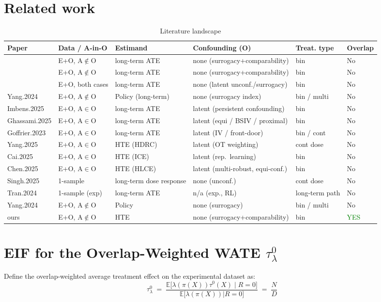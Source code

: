 \documentclass{article} %
\theoremstyle{plain} %
\theoremstyle{definition} %
\theoremstyle{remark} %
\begin{document}
\section{Related work}
\begin{table}[t]
\centering
\scriptsize
\begin{tabular}{llllll}
\toprule
Paper & Data / A-in-O & Estimand & Confounding (O) & Treat. type & Overlap \\
\midrule
\citet{Athey.2016} & E+O, A$\notin$O & long-term ATE & none (surrogacy+comparability) & bin & No \\
\citet{Athey.2019} & E+O, A$\notin$O & long-term ATE & none (surrogacy+comparability) & bin & No \\
\citet{Chen.2023} & E+O, both cases & long-term ATE & none (latent unconf./surrogacy) & bin & No \\
Yang.2024 & E+O, A$\notin$O & Policy (long-term) & none (surrogacy index) & bin / multi & No \\
\midrule
Imbens.2025 & E+O, A$\in$O & long-term ATE & latent (persistent confounding) & bin & No \\
Ghassami.2025 & E+O, A$\in$O & long-term ATE & latent (equi / BSIV / proximal) & bin & No \\
Goffrier.2023 & E+O, A$\in$O & long-term ATE & latent (IV / front-door) & bin / cont & No \\
\midrule
Yang.2025 & E+O, A$\in$O & HTE (HDRC) & latent (OT weighting) & cont dose &No \\
Cai.2025 & E+O, A$\in$O & HTE (ICE) & latent (rep.~learning) & bin & No \\
Chen.2025 & E+O, A$\in$O & HTE (HLCE) & latent (multi-robust, equi-conf.) & bin & No \\
Singh.2025 & 1-sample & long-term dose response & none (unconf.) & cont dose & No \\
\midrule
Tran.2024 & 1-sample (exp) & long-term ATE & n/a (exp., RL) & long-term path & No \\
Yang.2024 & E+O, A$\notin$O & Policy  & none (surrogacy) & bin / multi & No \\
ours & E+O, A$\notin$O & HTE & none (surrogacy+comparability) & bin & \textcolor{green}{YES} \\
\bottomrule
\end{tabular}
\caption{Literature landscape}
\end{table}





\section{EIF for the Overlap-Weighted WATE $\tau_\lambda^0$}
Define the overlap-weighted average treatment effect on the experimental dataset as:
\begin{equation}
    \tau_\lambda^0 \;=\; \frac{\mathbb{E}\bigl[\lambda(\pi(X))\tau^0(X) \mid R = 0 \bigr]}{\mathbb{E}\bigl[\lambda(\pi(X)) | R =0 \bigr]} \;=\;\frac{N}{D}
\end{equation}
\end{document}
